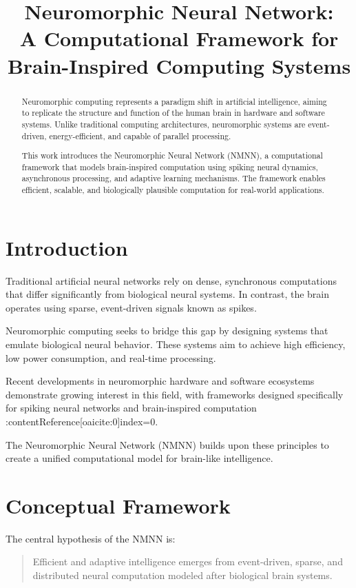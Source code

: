 \documentclass[12pt]{article}
\title{\textbf{Neuromorphic Neural Network: \\ A Computational Framework for Brain-Inspired Computing Systems}}
\author{}
\date{}
\begin{document}
\maketitle

\begin{abstract}
Neuromorphic computing represents a paradigm shift in artificial intelligence, aiming to replicate the structure and function of the human brain in hardware and software systems. Unlike traditional computing architectures, neuromorphic systems are event-driven, energy-efficient, and capable of parallel processing.

This work introduces the Neuromorphic Neural Network (NMNN), a computational framework that models brain-inspired computation using spiking neural dynamics, asynchronous processing, and adaptive learning mechanisms. The framework enables efficient, scalable, and biologically plausible computation for real-world applications.
\end{abstract}

\section{Introduction}

Traditional artificial neural networks rely on dense, synchronous computations that differ significantly from biological neural systems. In contrast, the brain operates using sparse, event-driven signals known as spikes.

Neuromorphic computing seeks to bridge this gap by designing systems that emulate biological neural behavior. These systems aim to achieve high efficiency, low power consumption, and real-time processing.

Recent developments in neuromorphic hardware and software ecosystems demonstrate growing interest in this field, with frameworks designed specifically for spiking neural networks and brain-inspired computation :contentReference[oaicite:0]{index=0}.

The Neuromorphic Neural Network (NMNN) builds upon these principles to create a unified computational model for brain-like intelligence.

\section{Conceptual Framework}

The central hypothesis of the NMNN is:

\begin{quote}
Efficient and adaptive intelligence emerges from event-driven, sparse, and distributed neural computation modeled after biological brain systems.
\end{quote}
\end{document}
